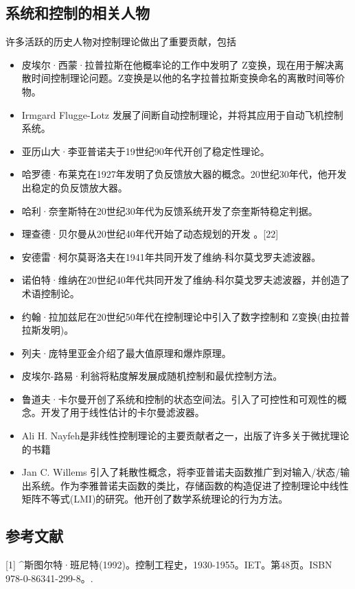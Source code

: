 \subsection{系统和控制的相关人物}

许多活跃的历史人物对控制理论做出了重要贡献，包括

\begin{itemize}
\item 皮埃尔·西蒙·拉普拉斯在他概率论的工作中发明了 Z变换，现在用于解决离散时间控制理论问题。Z变换是以他的名字拉普拉斯变换命名的离散时间等价物。
\item Irmgard Flugge-Lotz 发展了间断自动控制理论，并将其应用于自动飞机控制系统。
\item 亚历山大·李亚普诺夫于19世纪90年代开创了稳定性理论。
\item 哈罗德·布莱克在1927年发明了负反馈放大器的概念。20世纪30年代，他开发出稳定的负反馈放大器。
\item 哈利·奈奎斯特在20世纪30年代为反馈系统开发了奈奎斯特稳定判据。
\item 理查德·贝尔曼从20世纪40年代开始了动态规划的开发 。[22]
\item 安德雷·柯尔莫哥洛夫在1941年共同开发了维纳-科尔莫戈罗夫滤波器。
\item 诺伯特·维纳在20世纪40年代共同开发了维纳-科尔莫戈罗夫滤波器，并创造了术语控制论。
\item 约翰·拉加兹尼在20世纪50年代在控制理论中引入了数字控制和 Z变换(由拉普拉斯发明)。
\item 列夫·庞特里亚金介绍了最大值原理和爆炸原理。
\item 皮埃尔-路易·利翁将粘度解发展成随机控制和最优控制方法。
\item 鲁道夫·卡尔曼开创了系统和控制的状态空间法。引入了可控性和可观性的概念。开发了用于线性估计的卡尔曼滤波器。
\item Ali H. Nayfeh是非线性控制理论的主要贡献者之一，出版了许多关于微扰理论的书籍
\item Jan C. Willems 引入了耗散性概念，将李亚普诺夫函数推广到对输入/状态/输出系统。作为李雅普诺夫函数的类比，存储函数的构造促进了控制理论中线性矩阵不等式(LMI)的研究。他开创了数学系统理论的行为方法。
\end{itemize}


\subsection{参考文献}

[1]
^斯图尔特·班尼特(1992)。控制工程史，1930-1955。IET。第48页。ISBN 978-0-86341-299-8。.

